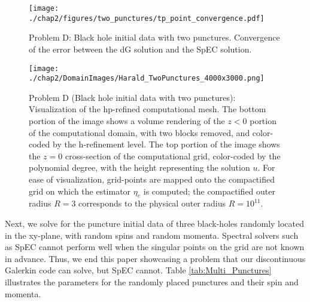\begin{figure}
  \centering
  \texttt{[image: ./chap2/figures/two\_punctures/tp\_point\_convergence.pdf]}
  \caption{Problem D: Black hole initial data with two punctures.  Convergence of the error between the dG solution and the SpEC solution.
  }
  \label{fig:Two_Punctures_Mesh_Convergence} 
\end{figure}

\begin{figure}
  \centering
\texttt{[image: ./chap2/DomainImages/Harald\_TwoPunctures\_4000x3000.png]}
  \caption{Problem D (Black hole initial data with two punctures):
    Visualization of the hp-refined computational mesh.  The bottom
    portion of the image shows a volume rendering of the $z<0$ portion
    of the computational domain, with two blocks removed, and
    color-coded by the h-refinement level.  The top portion of the
    image shows the $z=0$ cross-section of the computational grid, color-coded by the polynomial degree, with the height representing the solution $u$. For ease of visualization, grid-points are mapped onto the compactified grid on which the estimator $\eta_e$ is computed; the compactified outer radius $R=3$ corresponds to the physical outer radius $R=10^{11}$.}
  \label{fig:Two_Punctures_Mesh_Final}
\end{figure}



Next, we solve for the puncture initial data of three black-holes
randomly located in the xy-plane, with random spins and random
momenta. Spectral solvers such as SpEC cannot perform well when the
singular points on the grid are not known in advance. Thus, we end
this paper showcasing a problem that our discontinuous Galerkin code
can solve, but SpEC cannot. Table \ref{tab:Multi_Punctures}
illustrates the parameters for the randomly placed punctures and their
spin and momenta.


